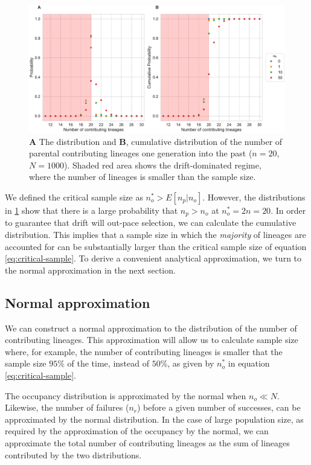 \documentclass[review]{elsarticle}
\begin{document}
\begin{figure}
  \centering
  \includegraphics[width=\textwidth]{fig/distributions.pdf}
  \caption{\textbf{A} The distribution and \textbf{B}, cumulative distribution of the number of
    parental contributing lineages one generation into the past ($n=20$, $N=1000$). Shaded red area
    shows the drift-dominated regime, where the number of lineages is smaller than the sample size.}
  \label{fig:sampling-dist}
\end{figure}

We defined the critical sample size as $n_o^* > E[n_p | n_o]$. However, the distributions in
\ref{fig:sampling-dist} show that there is a large probability that $n_p>n_o$ at $n_o^*=2n=20$. In
order to guarantee that drift will out-pace selection, we can calculate the cumulative distribution.
This implies that a sample size in which the \textit{majority} of lineages are accounted for can be
substantially larger than the critical sample size of equation \eqref{eq:critical-sample}. To derive
a convenient analytical approximation, we turn to the normal approximation in the next section.

\subsection{Normal approximation}

We can construct a normal approximation to the distribution of the number of contributing lineages.
This approximation will allow us to calculate sample size where, for example, the number of
contributing lineages is smaller that the sample size $95\%$ of the time, instead of $50\%$, as
given by $n_o^*$ in equation \eqref{eq:critical-sample}.

The occupancy distribution is approximated by the normal \citep{ONeill2019} when $n_o \ll N$.
Likewise, the number of failures ($n_r$) before a given number of successes, can be approximated by
the normal distribution. In the case of large population size, as required by the approximation of
the occupancy by the normal, we can approximate the total number of contributing lineages as the sum
of lineages contributed by the two distributions.
\end{document}
